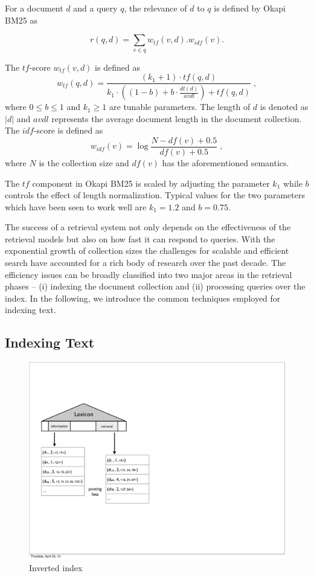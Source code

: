 \begin{definition}[Okapi BM25]
For a document $d$ and a query $q$, the relevance of $d$ to $q$   is defined by Okapi BM25 as

\begin{equation}
	r(q,d) = \sum_{v \in q} w_{tf}(v, d).w_{idf}(v). 
\end{equation}

The $tf$-score $w_{tf}(v, d)$ is defined as
  \begin{equation}
    \label{eq:5-ttix}
    w_{tf}(q, d) = \frac {(k_1 + 1) \cdot tf(q,d)} {k_1
      \cdot ((1-b) + b \cdot \frac{dl(d)}{avdl}) +
      tf(q,d)}\;,
  \end{equation}
where $0 \leq b \leq 1$ and $k_1 \geq 1$ are tunable parameters. The length of $d$ is denoted as $|d|$ and $avdl$ represents the average document length in the document collection. 
$$
$$
The $idf$-score is defined as
 \begin{equation}
    \label{eq:5-ttix}
    w_{idf}(v) = \log{\frac{N - df(v) + 0.5}{df(v) + 0.5}}\;,
  \end{equation}
where $N$ is the collection size and $df(v)$ has the aforementioned semantics.
\end{definition}

The $tf$ component in Okapi BM25 is scaled by adjusting the parameter $k_1$ while $b$ controls the effect of length normalization. Typical values for the two parameters which have been seen to work well are $k_1 = 1.2$ and $b=0.75$.


The success of a retrieval system not only depends on the effectiveness of the retrieval models but also on how fast it can respond to queries. With the exponential growth of collection sizes the challenges for scalable and efficient search have accounted for a rich body of research over the past decade. The efficiency issues can be broadly classified into two major areas in the retrieval phases -- (i) indexing the document collection and (ii) processing queries over the index. In the following, we introduce the common techniques employed for indexing text. 

\subsection{Indexing Text}

 \begin{figure}[tb]
  \centering
    \includegraphics[width=0.6\columnwidth]{resources/inverted_index.pdf}
  \caption{Inverted index} 
    \label{fig:inverted_index}
\end{figure}


